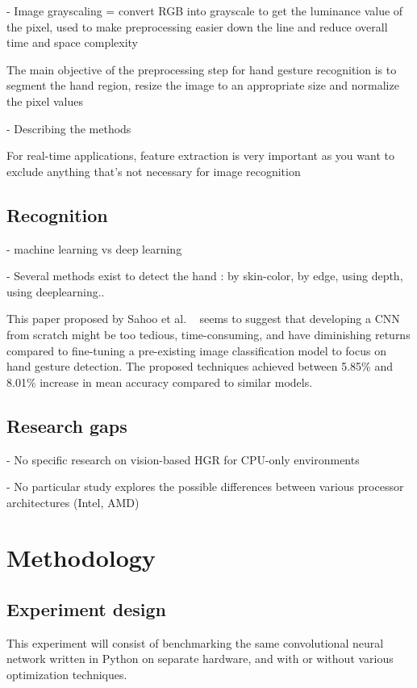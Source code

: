 \documentclass[12pt]{article}
\begin{document}
  - Image grayscaling = convert RGB into grayscale to get the luminance value of the pixel, used to make preprocessing easier down the line and reduce overall time and space complexity

  The main objective of the preprocessing step for hand gesture recognition is to segment the hand region, resize the image to an appropriate size and normalize the pixel values

  - Describing the methods

  For real-time applications, feature extraction is very important as you want to exclude anything that's not necessary for image recognition

  \subsection{Recognition}
  - machine learning vs deep learning

  - Several methods exist to detect the hand : by skin-color, by edge, using depth, using deeplearning..

  This paper proposed by Sahoo et al. ~\cite{sahoo2022real} seems to suggest that developing a CNN from scratch might be too tedious, time-consuming, and have diminishing returns compared to fine-tuning a pre-existing image classification model to focus on hand gesture detection. The proposed techniques achieved between 5.85\% and 8.01\% increase in mean accuracy compared to similar models.

  \subsection{Research gaps}

  - No specific research on vision-based HGR for CPU-only environments

  - No particular study explores the possible differences between various processor architectures (Intel, AMD)

  \section{Methodology}

  \subsection{Experiment design}

  This experiment will consist of benchmarking the same convolutional neural network written in Python on separate hardware, and with or without various optimization techniques.
\end{document}
